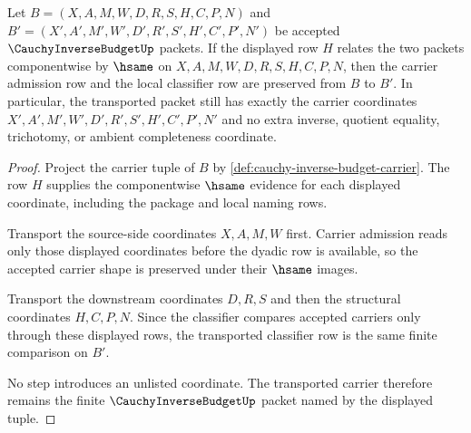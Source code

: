 \begin{theorem}
\label{thm:cauchy-inverse-budget-transport-stability}
Let $B=(X,A,M,W,D,R,S,H,C,P,N)$ and $B'=(X',A',M',W',D',R',S',H',C',P',N')$ be accepted $\CauchyInverseBudgetUp$ packets. If the displayed row $H$ relates the two packets componentwise by $\hsame$ on $X,A,M,W,D,R,S,H,C,P,N$, then the carrier admission row and the local classifier row are preserved from $B$ to $B'$. In particular, the transported packet still has exactly the carrier coordinates $X',A',M',W',D',R',S',H',C',P',N'$ and no extra inverse, quotient equality, trichotomy, or ambient completeness coordinate.
\end{theorem}
\begin{proof}
Project the carrier tuple of $B$ by \autoref{def:cauchy-inverse-budget-carrier}. The row $H$ supplies the componentwise $\hsame$ evidence for each displayed coordinate, including the package and local naming rows.

Transport the source-side coordinates $X,A,M,W$ first. Carrier admission reads only those displayed coordinates before the dyadic row is available, so the accepted carrier shape is preserved under their $\hsame$ images.

Transport the downstream coordinates $D,R,S$ and then the structural coordinates $H,C,P,N$. Since the classifier compares accepted carriers only through these displayed rows, the transported classifier row is the same finite comparison on $B'$.

No step introduces an unlisted coordinate. The transported carrier therefore remains the finite $\CauchyInverseBudgetUp$ packet named by the displayed tuple.
\end{proof}

